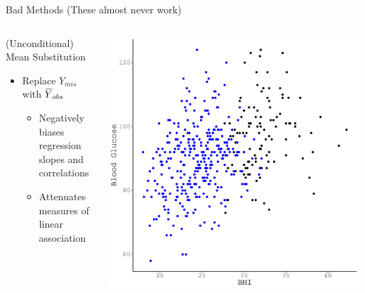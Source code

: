 \documentclass{beamer}\usepackage[]{graphicx}\usepackage[]{color}
\makeatletter
\def\maxwidth{ %
  \ifdim\Gin@nat@width>\linewidth
    \linewidth
  \else
    \Gin@nat@width
  \fi
}
\newenvironment{knitrout}{}{} %
\newcommand*\bigbar[1]{%
  \hbox{%
    \vbox{%
      \hrule height 0.65pt %
      \kern0.35ex%
      \hbox{%
        \kern-0.1em%
        \ensuremath{#1}%
      }%
    }%
  }%
}
\makeatother
\begin{document}

\begin{frame}{Bad Methods (These almost never work)}
  
  \begin{columns}
    \begin{column}{0.5\textwidth}
      
      (Unconditional) Mean Substitution
      \begin{itemize}
      \item Replace $Y_{mis}$ with $\bigbar{Y}_{obs}$
        \begin{itemize}
        \item Negatively biases regression slopes and correlations
        \item Attenuates measures of linear association
        \end{itemize}
      \end{itemize}
      
    \end{column}
    \begin{column}{0.5\textwidth}
      
\begin{knitrout}\footnotesize
{}\color{fgcolor}

{\centering \includegraphics[width=\maxwidth]{figure/unnamed-chunk-18-1} 

}



\end{knitrout}

\end{column}
\end{columns}

\end{frame}
\end{document}
